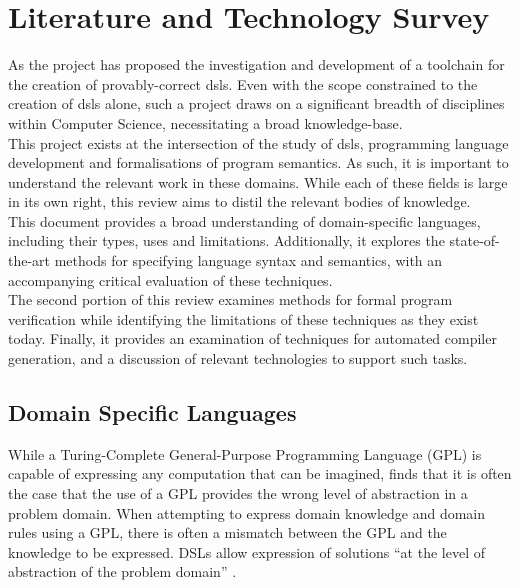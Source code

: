 \chapter{Literature and Technology Survey} %
\label{cha:literature_and_technology_survey}
As the project has proposed the investigation and development of a toolchain for the creation of provably-correct \glspl{dsl}.
Even with the scope constrained to the creation of \glspl{dsl} alone, such a project draws on a significant breadth of disciplines within Computer Science, necessitating a broad knowledge-base. \\

This project exists at the intersection of the study of \glspl{dsl}, programming language development and formalisations of program semantics. 
As such, it is important to understand the relevant work in these domains. 
While each of these fields is large in its own right, this review aims to distil the relevant bodies of knowledge. \\

This document provides a broad understanding of domain-specific languages, including their types, uses and limitations.
Additionally, it explores the state-of-the-art methods for specifying language syntax and semantics, with an accompanying critical evaluation of these techniques.\\

The second portion of this review examines methods for formal program verification while identifying the limitations of these techniques as they exist today. 
Finally, it provides an examination of techniques for automated compiler generation, and a discussion of relevant technologies to support such tasks. 

\section{Domain Specific Languages} %
\label{sec:domain_specific_languages}

While a Turing-Complete General-Purpose Programming Language (GPL) is capable of expressing any computation that can be imagined, \citet{fowler2010domain} finds that it is often the case that the use of a GPL provides the wrong level of abstraction in a problem domain.
When attempting to express domain knowledge and domain rules using a GPL, there is often a mismatch between the GPL and the knowledge to be expressed. 
DSLs allow expression of solutions ``at the level of abstraction of the problem domain'' \citep{van2000domain}.\\

